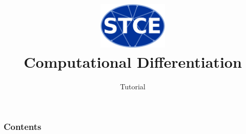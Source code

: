\documentclass{beamer}
\begin{document}
\title{\centering
\includegraphics[width=0.25\textwidth]{./figures/logo.eps} \\ Computational Differentiation}

\subtitle{Tutorial}
\author{}
\date{}
\frame[plain]{\titlepage}

\begin{frame}
\frametitle{Contents}
\end{frame}
\end{document}
